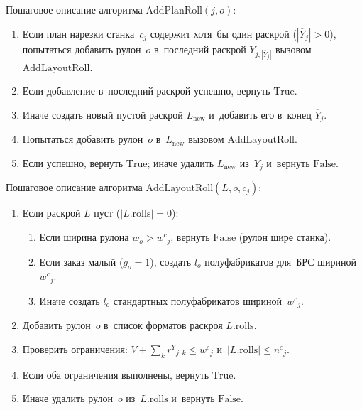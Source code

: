 Пошаговое описание алгоритма $\mathrm{AddPlanRoll}(j, o)$:
\begin{enumerate}
  \item Если план нарезки станка~$c_j$ содержит хотя~бы один раскрой ($|\overline{Y}_j|>0$), попытаться добавить рулон~$o$ в~последний раскрой $Y_{j,|\overline{Y}_j|}$ вызовом $\mathrm{AddLayoutRoll}$.
  \item Если добавление в~последний раскрой успешно, вернуть $\mathrm{True}$.
  \item Иначе создать новый пустой раскрой $L_{\mathrm{new}}$ и~добавить его в~конец $\overline{Y}_j$.
  \item Попытаться добавить рулон~$o$ в~$L_{\mathrm{new}}$ вызовом $\mathrm{AddLayoutRoll}$.
  \item Если успешно, вернуть $\mathrm{True}$; иначе удалить $L_{\mathrm{new}}$ из~$\overline{Y}_j$ и~вернуть $\mathrm{False}$.
\end{enumerate}

\begin{center}
\resizebox{\textwidth}{!}{%
    
}
\label{alg:add_layout_roll}
\end{center}

Пошаговое описание алгоритма $\mathrm{AddLayoutRoll}(L, o, c_j)$:
\begin{enumerate}
  \item Если раскрой $L$ пуст ($|L.\mathrm{rolls}|=0$):
  \begin{enumerate}
    \item Если ширина рулона $w_o > {w^c}_j$, вернуть $\mathrm{False}$ (рулон шире станка).
    \item Если заказ малый ($g_o=1$), создать $l_o$ полуфабрикатов для~БРС шириной~${w^c}_j$.
    \item Иначе создать $l_o$ стандартных полуфабрикатов шириной~${w^c}_j$.
  \end{enumerate}
  \item Добавить рулон~$o$ в~список форматов раскроя $L.\mathrm{rolls}$.
  \item Проверить ограничения: $V + \sum_k {r^Y}_{j,k} \le {w^c}_j$ и~$|L.\mathrm{rolls}| \le {n^c}_j$.
  \item Если оба ограничения выполнены, вернуть $\mathrm{True}$.
  \item Иначе удалить рулон~$o$ из~$L.\mathrm{rolls}$ и~вернуть $\mathrm{False}$.
\end{enumerate}

